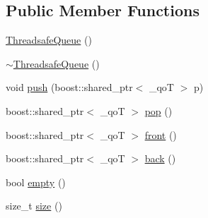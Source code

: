 \subsection*{Public Member Functions}
\begin{DoxyCompactItemize}
\item 
\hyperlink{a00046_a77e614d9676f60c19e0eaa4c50f3f804}{Threadsafe\-Queue} ()
\item 
\hyperlink{a00046_ac561918dd6c95c7334b2e56917a74567}{$\sim$\-Threadsafe\-Queue} ()
\item 
void \hyperlink{a00046_aaca1e00d06c1eb749f6a293d1ca07a7d}{push} (boost\-::shared\-\_\-ptr$<$ \-\_\-qo\-T $>$ p)
\item 
boost\-::shared\-\_\-ptr$<$ \-\_\-qo\-T $>$ \hyperlink{a00046_a0bbccaf15a770fd0b3b16b85ed957c8d}{pop} ()
\item 
boost\-::shared\-\_\-ptr$<$ \-\_\-qo\-T $>$ \hyperlink{a00046_abb61873eafe8958aad8f6bca8f00a4b3}{front} ()
\item 
boost\-::shared\-\_\-ptr$<$ \-\_\-qo\-T $>$ \hyperlink{a00046_ad6f26dad2d2e9111c8c06f3dbda04c76}{back} ()
\item 
bool \hyperlink{a00046_a3fa0826aed79b1164a45eb0517248819}{empty} ()
\item 
size\-\_\-t \hyperlink{a00046_a8c89a9c02a8a05ae2336f27b57502c87}{size} ()
\end{DoxyCompactItemize}


